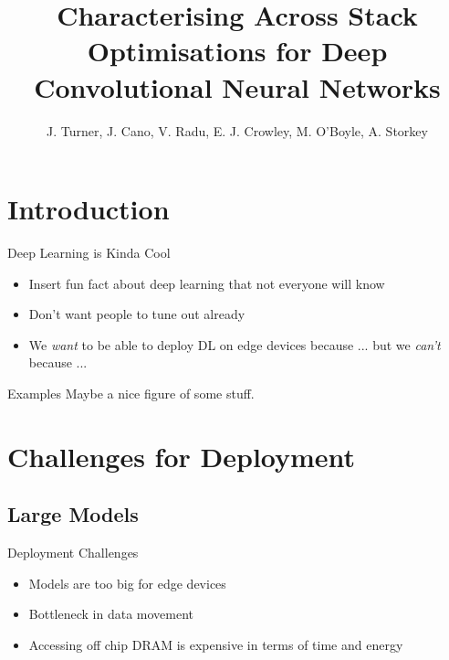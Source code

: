 \documentclass{beamer}
\title[IISWC 2018 Presentation]{Characterising Across Stack Optimisations for Deep Convolutional Neural Networks}
\author{J. Turner, J. Cano, V. Radu, E. J. Crowley, M. O’Boyle, A. Storkey}
\institute{University of Edinburgh}
\date{}
\begin{document}
\begin{frame}
  \titlepage
\end{frame}


\section{Introduction}

\begin{frame}{Deep Learning is Kinda Cool}

\begin{itemize}
  \item Insert fun fact about deep learning that not everyone will know
  \item Don't want people to tune out already
  \item We \textit{want} to be able to deploy DL on edge devices because ... but we \textit{can't} because ...
\end{itemize}

\vskip 1cm

\begin{block}{Examples}
Maybe a nice figure of some stuff.
\end{block}

\end{frame}

\section{Challenges for Deployment}

\subsection{Large Models}

\begin{frame}{Deployment Challenges}

\begin{itemize}
	\item Models are too big for edge devices 
    \item Bottleneck in data movement
    \item Accessing off chip DRAM is expensive in terms of time and energy
\end{itemize}

\end{frame}
\end{document}
